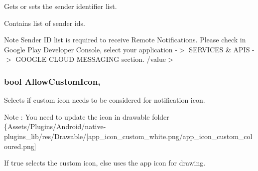 Gets or sets the sender identifier list. 

Contains list of sender ids. \begin{DoxyNote}{Note}
Sender I\+D list is required to receive Remote Notifications. Please check in Google Play Developer Console, select your application -\/$>$ S\+E\+R\+V\+I\+C\+E\+S \& A\+P\+I\+S -\/$>$ G\+O\+O\+G\+L\+E C\+L\+O\+U\+D M\+E\+S\+S\+A\+G\+I\+N\+G section. /value$>$ 
\end{DoxyNote}
\hypertarget{class_voxel_busters_1_1_native_plugins_1_1_notification_service_settings_1_1_android_settings_ac29fd462e0962c7af298777073636fa5}{}
\subsubsection[{Allow\+Custom\+Icon}]{\setlength{\rightskip}{0pt plus 5cm}bool Allow\+Custom\+Icon\hspace{0.3cm}{\ttfamily [get]}, {\ttfamily [set]}}\label{class_voxel_busters_1_1_native_plugins_1_1_notification_service_settings_1_1_android_settings_ac29fd462e0962c7af298777073636fa5}


Selects if custom icon needs to be considered for notification icon. 

\begin{DoxyNote}{Note}
\+: You need to update the icon in drawable folder \{Assets/\+Plugins/\+Android/native-\/plugins\+\_\+lib/res/\+Drawable/\mbox{[}app\+\_\+icon\+\_\+custom\+\_\+white.\+png/app\+\_\+icon\+\_\+custom\+\_\+coloured.png\mbox{]} 
\end{DoxyNote}


If true selects the custom icon, else uses the app icon for drawing.\hypertarget{class_voxel_busters_1_1_native_plugins_1_1_notification_service_settings_1_1_android_settings_a4fa7d8c826b9a9ed9549bf8ef8668e6c}{}
